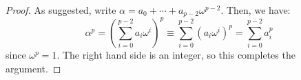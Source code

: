 \begin{proof}
    As suggested, write $\alpha = a_0 + \cdots + a_{p-2}\omega^{p-2}$. Then, we have:
    \[ \alpha^p = \left(\sum_{i=0}^{p-2} a_i\omega^i\right)^p \equiv \sum_{i=0}^{p-2} (a_i\omega^i)^p = \sum_{i=0}^{p-2} a_i^p \]
    since $\omega^p = 1$. The right hand side is an integer, so this completes the argument.
\end{proof}
